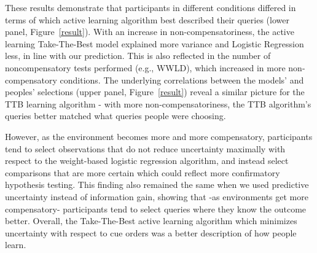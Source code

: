 \documentclass[10pt,letterpaper]{article}
\begin{document}
These results demonstrate that participants in different conditions differed in terms of which active learning algorithm best described their queries (lower panel, Figure~\ref{result}). With an increase in non-compensatoriness, the active learning Take-The-Best model explained more variance and Logistic Regression less, in line with our prediction. This is also reflected in the number of noncompensatory tests performed (e.g., WWLD), which increased in more non-compensatory conditions. The underlying correlations between the models' and peoples' selections (upper panel, Figure~\ref{result}) reveal a similar picture for the TTB learning algorithm - with more non-compensatoriness, the TTB algorithm's queries better matched what queries people were choosing. 

However, as the environment becomes more and more compensatory, participants tend to select observations that do not reduce uncertainty maximally with respect to the weight-based logistic regression algorithm, and instead select comparisons that are more certain which could reflect more confirmatory hypothesis testing. This finding also remained the same when we used predictive uncertainty instead of information gain, showing that -as environments get more compensatory- participants tend to select queries where they know the outcome better. Overall, the Take-The-Best active learning algorithm which minimizes uncertainty with respect to cue orders was a better description of how people learn.
\end{document}
